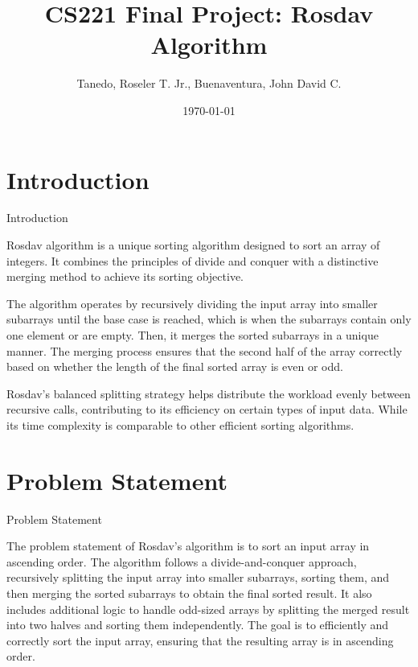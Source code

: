 \documentclass[10pt]{beamer}
\title{CS221 Final Project: Rosdav Algorithm}
\author{Tanedo, Roseler T. Jr., Buenaventura, John David C.}
\institute{BatStateU - Alangilan}
\date{\today}
\begin{document}
\begin{frame}
  \titlepage
\end{frame}

\section{Introduction}
\begin{frame}{Introduction}

\begin{tcolorbox}[colback=blue!5,colframe=blue!40!black]
Rosdav algorithm is a unique sorting algorithm designed to sort an array of integers. It combines the principles of divide and conquer with a distinctive merging method to achieve its sorting objective.


\medskip The algorithm operates by recursively dividing the input array into smaller subarrays until the base case is reached, which is when the subarrays contain only one element or are empty. Then, it merges the sorted subarrays in a unique manner. The merging process ensures that the second half of the array correctly based on whether the length of the final sorted array is even or odd.

\medskip Rosdav's balanced splitting strategy helps distribute the workload evenly between recursive calls, contributing to its efficiency on certain types of input data. While its time complexity is comparable to other efficient sorting algorithms.
\end{tcolorbox}
\end{frame}

\section{Problem Statement}
\begin{frame}{Problem Statement}
\begin{tcolorbox}[colback=blue!5,colframe=blue!40!black]
  \large The problem statement of Rosdav's algorithm is to sort an input array in ascending order. The algorithm follows a divide-and-conquer approach, recursively splitting the input array into smaller subarrays, sorting them, and then merging the sorted subarrays to obtain the final sorted result. It also includes additional logic to handle odd-sized arrays by splitting the merged result into two halves and sorting them independently. The goal is to efficiently and correctly sort the input array, ensuring that the resulting array is in ascending order.
\end{tcolorbox}
\end{frame}
\end{document}
